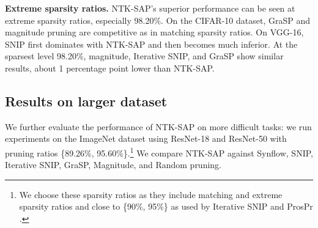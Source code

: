 \documentclass{article} %
\begin{document}
\textbf{Extreme sparsity ratios.} NTK-SAP's superior performance can be seen at extreme sparsity ratios, especially 98.20\%. On the CIFAR-10 dataset, GraSP and magnitude pruning are competitive as in matching sparsity ratios. On VGG-16, SNIP first dominates with NTK-SAP and then becomes much inferior. At the sparsest level 98.20\%, magnitude, Iterative SNIP, and GraSP show similar results, about 1 percentage point lower than NTK-SAP. 

\subsection{Results on larger dataset}
We further evaluate the performance of NTK-SAP on more difficult tasks: we run experiments on the ImageNet dataset using ResNet-18 and ResNet-50 with pruning ratios \{89.26\%, 95.60\%\}.\footnote{We choose these sparsity ratios as they include matching and extreme sparsity ratios and close to \{90\%, 95\%\} as used by Iterative SNIP \citep{force} and ProsPr \citep{alizadeh2022prospect}.} We compare NTK-SAP against Synflow, SNIP, Iterative SNIP, GraSP, Magnitude, and Random pruning.
\end{document}
